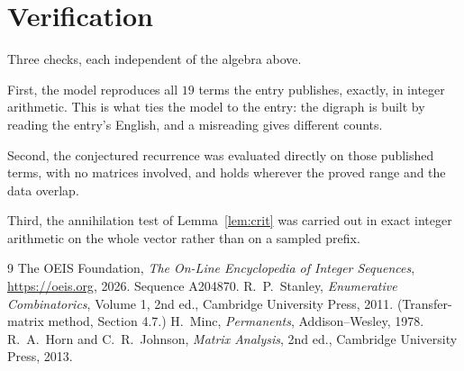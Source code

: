\documentclass[11pt,a4paper]{article}
\theoremstyle{plain}
\theoremstyle{definition}
\begin{document}
\section{Verification}

Three checks, each independent of the algebra above.

First, the model reproduces all $19$ terms the entry publishes, exactly, in integer
arithmetic. This is what ties the model to the entry: the digraph is built by reading the
entry's English, and a misreading gives different counts.

Second, the conjectured recurrence was evaluated directly on those published terms, with no
matrices involved, and holds wherever the proved range and the data overlap.

Third, the annihilation test of Lemma~\ref{lem:crit} was carried out in exact integer
arithmetic on the whole vector rather than on a sampled prefix.

\begin{thebibliography}{9}
 The OEIS Foundation, \emph{The On-Line Encyclopedia of Integer
Sequences}, \url{https://oeis.org}, 2026. Sequence A204870.
 R.~P.~Stanley, \emph{Enumerative Combinatorics}, Volume 1, 2nd ed.,
Cambridge University Press, 2011. (Transfer-matrix method, Section 4.7.)
 H.~Minc, \emph{Permanents}, Addison--Wesley, 1978.
 R.~A.~Horn and C.~R.~Johnson, \emph{Matrix Analysis}, 2nd ed., Cambridge
University Press, 2013.
\end{thebibliography}
\end{document}

